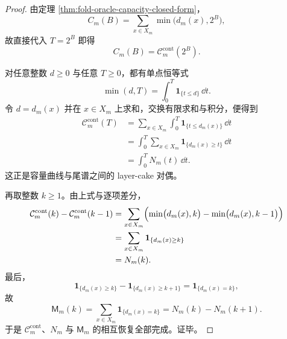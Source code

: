 \begin{proof}
由定理 \ref{thm:fold-oracle-capacity-closed-form}，
\[
C_m(B)=\sum_{x\in X_m}\min\bigl(d_m(x),2^B\bigr),
\]
故直接代入 \(T=2^B\) 即得
\[
C_m(B)=\mathcal C_m^{\mathrm{cont}}(2^B).
\]

对任意整数 \(d\ge 0\) 与任意 \(T\ge 0\)，都有单点恒等式
\[
\min(d,T)=\int_0^T \mathbf 1_{\{t\le d\}}\,\dd t.
\]
令 \(d=d_m(x)\) 并在 \(x\in X_m\) 上求和，交换有限求和与积分，便得到
\[
\begin{aligned}
\mathcal C_m^{\mathrm{cont}}(T)
&=
\sum_{x\in X_m}\int_0^T \mathbf 1_{\{t\le d_m(x)\}}\,\dd t\\
&=
\int_0^T \sum_{x\in X_m}\mathbf 1_{\{d_m(x)\ge t\}}\,\dd t\\
&=
\int_0^T N_m(t)\,\dd t.
\end{aligned}
\]
这正是容量曲线与尾谱之间的 layer-cake 对偶。

再取整数 \(k\ge 1\)。由上式与逐项差分，
\[
\begin{aligned}
\mathcal C_m^{\mathrm{cont}}(k)-\mathcal C_m^{\mathrm{cont}}(k-1)
&=
\sum_{x\in X_m}
\Bigl(\min\bigl(d_m(x),k\bigr)-\min\bigl(d_m(x),k-1\bigr)\Bigr)\\
&=
\sum_{x\in X_m}\mathbf 1_{\{d_m(x)\ge k\}}\\
&=
N_m(k).
\end{aligned}
\]
最后，
\[
\mathbf 1_{\{d_m(x)\ge k\}}-\mathbf 1_{\{d_m(x)\ge k+1\}}
=
\mathbf 1_{\{d_m(x)=k\}},
\]
故
\[
\mathsf M_m(k)
=
\sum_{x\in X_m}\mathbf 1_{\{d_m(x)=k\}}
=
N_m(k)-N_m(k+1).
\]
于是 \(\mathcal C_m^{\mathrm{cont}}\)、\(N_m\) 与 \(\mathsf M_m\) 的相互恢复全部完成。证毕。
\end{proof}

